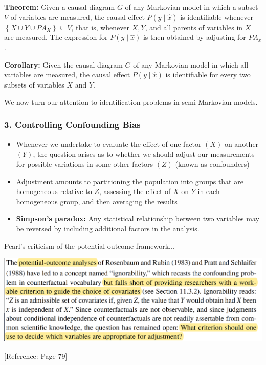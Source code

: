\documentclass{beamer}
\begin{document}
\begin{frame}
\textbf{Theorem:} Given a causal diagram $G$ of any Markovian model in which a subset $V$ of variables are measured, the causal effect $P(y \mid \hat{x})$ is identifiable whenever $\left\{X \cup Y \cup P A_X\right\} \subseteq V$, that is, whenever $X, Y$, and all parents of variables in $X$ are measured. The expression for $P(y \mid \hat{x})$ is then obtained by adjusting for $P A_x$.

\vspace{0.4cm}
\textbf{Corollary:} Given the causal diagram $G$ of any Markovian model in which all variables are measured, the causal effect $P(y \mid \hat{x})$ is identifiable for every two subsets of variables $X$ and $Y$.

\vspace{0.4cm}
We now turn our attention to identification problems in semi-Markovian models.
\end{frame}

\begin{frame}
\frametitle{3. Controlling Confounding Bias}
\begin{itemize}
\item Whenever we undertake to evaluate the effect of one factor $(X)$ on another $(Y)$, the question arises as to whether we should adjust our measurements for possible variations in some other factors $(Z)$ (known as confounders)
\item Adjustment amounts to partitioning the population into groups that are homogeneous relative to $Z$, assessing the effect of $X$ on $Y$ in each homogeneous group, and then averaging the results
\item \textbf{Simpson's paradox:} Any statistical relationship between two variables may be reversed by including additional factors in the analysis.
\end{itemize}
\end{frame}

\begin{frame}
Pearl's criticism of the potential-outcome framework...

\vspace{0.4cm}
\includegraphics[scale=0.37]{img/fig_3}

\vspace{0.4cm}
[Reference: Page 79]
\end{frame}
\end{document}
